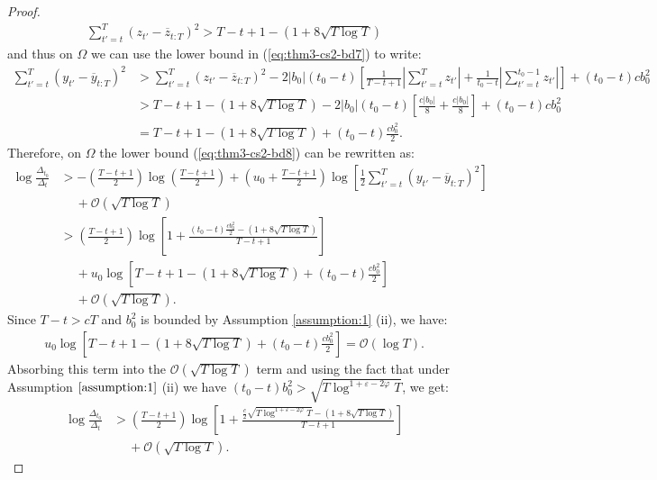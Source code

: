\documentclass{article}
\begin{document}
\begin{proof}
\begin{align*}
    \sum_{t'=t}^T (z_{t'} - \overline{z}_{t:T})^2 > T-t +1 - (1 + 8\sqrt{T \log T})
\end{align*}
and thus on $\Omega$ we can use the lower bound in (\ref{eq:thm3-cs2-bd7}) to write:
\begin{align*}
    \sum_{t'=t}^T (y_{t'} - \overline{y}_{t:T})^2 &> \sum_{t'=t}^T (z_{t'} - \overline{z}_{t:T})^2 - 2|b_0|(t_0-t)\left[\frac{1}{T-t+1} \left|\sum_{t'=t}^T z_{t'}\right| + \frac{1}{t_0-t}\left|\sum_{t' = t}^{t_0 - 1} z_{t'}\right|\right] + (t_0-t)cb_0^2 \\
    &> T-t +1 - (1 + 8\sqrt{T \log T}) - 2|b_0|(t_0-t)\left[\frac{c|b_0|}{8} + \frac{c|b_0|}{8}\right] + (t_0-t)cb_0^2 \\
    &= T-t +1 - (1 + 8\sqrt{T \log T}) + (t_0-t)\frac{cb_0^2}{2}.
\end{align*}
Therefore, on $\Omega$ the lower bound (\ref{eq:thm3-cs2-bd8}) can be rewritten as:
\begin{align*}
    \log \frac{\Delta_{t_0}}{\Delta_t} &> - \left(\frac{T - t + 1}{2}\right) \log\left(\frac{T-t+1}{2}\right) + \left(u_0 + \frac{T - t +1}{2}\right)\log\left[ \frac{1}{2}\sum_{t'=t}^T (y_{t'} - \overline{y}_{t:T})^2 \right] \\
    &\quad\: +  \mathcal{O}(\sqrt{T \log T}) \\
    &> \left(\frac{T - t + 1}{2}\right) \log\left[1 + \frac{(t_0-t)\frac{cb_0^2}{2} - (1 + 8\sqrt{T \log T})}{T-t+1}\right] \\
    &\quad\: + u_0 \log \left[T-t +1 - (1 + 8\sqrt{T \log T}) + (t_0-t)\frac{cb_0^2}{2}\right] \\
    &\quad\: +  \mathcal{O}(\sqrt{T \log T}).
\end{align*}
Since $T-t > cT$ and $b_0^2$ is bounded by Assumption \ref{assumption:1} (ii), we have:
\begin{align*}
    u_0 \log \left[T-t +1 - (1 + 8\sqrt{T \log T}) + (t_0-t)\frac{cb_0^2}{2}\right] = \mathcal{O} (\log T). 
\end{align*}
Absorbing this term into the $\mathcal{O}(\sqrt{T \log T})$ term and using the fact that under Assumption $\ref{assumption:1}$ (ii) we have $(t_0 - t) b_0^2 > \sqrt{T \log^{1 +\varepsilon-2\varphi} T}$, we get:
\begin{align*}
    \log \frac{\Delta_{t_0}}{\Delta_t} &> \left(\frac{T - t + 1}{2}\right) \log\left[1 + \frac{\frac{c}{2}\sqrt{T \log^{1 +\varepsilon-2\varphi} T} - (1 + 8\sqrt{T \log T})}{T-t+1}\right] \\
    &\quad\: +  \mathcal{O}(\sqrt{T \log T}).

\end{align*}
\end{proof}
\end{document}
